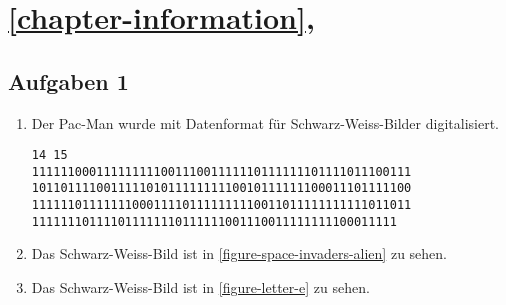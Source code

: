 \section{\autoref{chapter-information}, }

\subsection*{Aufgaben 1}

\begin{enumerate}
\item Der Pac-Man wurde mit  Datenformat für Schwarz-Weiss-Bilder digitalisiert.
\begin{verbatim}
14 15
11111100011111111100111001111110111111101111011100111
10110111100111110101111111110010111111100011101111100
11111101111111000111101111111110011011111111111011011
111111101111011111110111111001110011111111100011111
\end{verbatim}
\item Das Schwarz-Weiss-Bild ist in \autoref{figure-space-invaders-alien} zu sehen.
\item Das Schwarz-Weiss-Bild ist in \autoref{figure-letter-e} zu sehen.
\end{enumerate}
